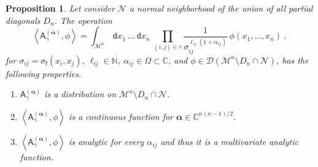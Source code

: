 \documentclass[11pt]{book}
\newcommand{\alphabd}{\boldsymbol{\alpha}}
\newcommand{\sm}[1]{\left\langle#1\right\rangle}
\newcommand{\Dcal}{\mathcal{D}}
\newcommand{\Mcal}{\mathcal{M}}
\newcommand{\Ncal}{\mathcal{N}}
\newcommand{\Cbb}{\mathbb{C}}
\newcommand{\Nbb}{\mathbb{N}}
\newcommand{\Asf}{\mathsf{A}}
\newcommand{\dsf}{\mathsf{d}}
\newcommand{\fsf}{\mathsf{f}}
\theoremstyle{break}
\newtheorem{proposition}{Proposition}[chapter]
\begin{document}
\begin{proposition}\label{prop:amplitude_sigma_prop_analyt}
Let consider $\Ncal$ a normal neighborhood of the union of all partial diagonals $D_n$. The operation
%
\begin{equation}
\sm{ \Asf_\gamma^{(\alphabd)} , \phi } = \int_{\Mcal^n} \ \dsf x_1 \ \dots \ \dsf x_n \ \prod_{(i,j)\in\gamma} \frac{1}{\sigma_{ij}^{\ell_{ij}(1+ \alpha_{ij})}} \ \phi(x_1,\dots,x_n) \ , 
\label{eq:amplitude_sigma_prop_analyt}
\end{equation}
%
for $\sigma_{ij}=\sigma_\fsf(x_i,x_j)$, $\ell_{ij} \in \Nbb$, $\alpha_{ij}\in\Omega\subset\Cbb$, and $\phi\in \Dcal(\Mcal^n\setminus D_n\cap \Ncal)$, has the following properties.
%
\begin{enumerate}
%
\item\label{item:1_amplitude_sigma_prop_analyt} $\Asf_\gamma^{(\alphabd)}$ is a distribution on $\Mcal^n\setminus D_n\cap \Ncal$.
%
\item\label{item:2_amplitude_sigma_prop_analyt} $\sm{ \Asf_\gamma^{(\alphabd)} , \phi }$ is a continuous function for $\alphabd \in \Cbb^{n(n-1)/2}$.
%
\item\label{item:3_amplitude_sigma_prop_analyt} $\sm{ \Asf_\gamma^{(\alphabd)} , \phi }$ is analytic for every $\alpha_{ij}$ and thus it is a multivariate analytic function.
%
\end{enumerate}
%
\end{proposition}
\end{document}
